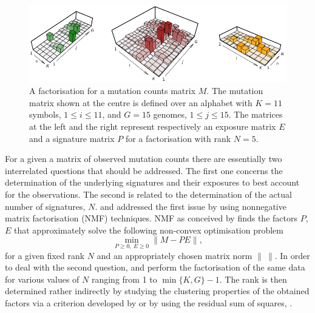 \documentclass{bioinfo}
\begin{document}
\begin{figure}
 \centering\includegraphics[width=15cm]{figs/f}
 \caption{\textrm{%
  A factorisation for a mutation counts matrix $M$. The
  mutation matrix shown at the centre is defined over an alphabet with
  $K=11$ symbols, $1 \leqslant i \leqslant 11$, and $G=15$ genomes,
  $1\leqslant j\leqslant 15$. The matrices at the left and the right 
  represent respectively an exposure  matrix $E$ and a signature matrix
  $P$ for a factorisation with rank $N=5$.
  }
 }
\label{fig:toyNMF}
\end{figure}

For a given a matrix of observed mutation counts there are essentially
two interrelated questions that should be addressed. The first one
concerns the determination of the underlying signatures and their
exposures to best account for the observations. The second is related
to the determination of the actual number of signatures,
$N$. \cite{NCell} and \cite{A} addressed the first issue by using
nonnegative matrix factorisation (NMF) techniques.  NMF as conceived
by \cite{LS} finds the factors $P$, $E$ that approximately solve the
following non-convex optimisation problem
\begin{equation}
 \label{eqn:NMF}
  \min_{P\geqslant 0,\ E\geqslant 0}\|M - PE\|,
\end{equation}
for a given fixed rank $N$ and an appropriately chosen matrix norm
$\|\ \|$.  In order to deal with the second question, \cite{NCell} and
\cite{A} perform the factorisation of the same data for various
values of $N$ ranging from 1 to $\min\{K, G\}-1$. The rank is then
determined rather indirectly by studying the clustering properties of
the obtained factors via a criterion developed by \cite{BTGM} or by 
using the residual sum of squares, \cite{HMSG}.
\end{document}
